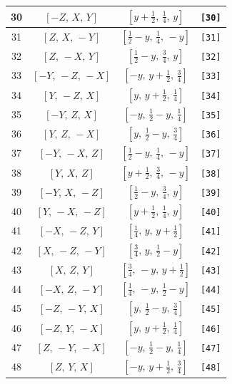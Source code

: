\documentclass[fleqn,8pt]{jsarticle}
\begin{document}
\begin{longtable}{cccc}
30 & $\left[ - Z,\, X,\, Y \right]$ & $\left[ y + \frac{1}{2},\, \frac{1}{4},\, y \right]$ & {\tt [30]} \\ \hline
31 & $\left[ Z,\, X,\, - Y \right]$ & $\left[ \frac{1}{2} - y,\, \frac{1}{4},\, - y \right]$ & {\tt [31]} \\ \hline
32 & $\left[ Z,\, - X,\, Y \right]$ & $\left[ \frac{1}{2} - y,\, \frac{3}{4},\, y \right]$ & {\tt [32]} \\ \hline
33 & $\left[ - Y,\, - Z,\, - X \right]$ & $\left[ - y,\, y + \frac{1}{2},\, \frac{3}{4} \right]$ & {\tt [33]} \\ \hline
34 & $\left[ Y,\, - Z,\, X \right]$ & $\left[ y,\, y + \frac{1}{2},\, \frac{1}{4} \right]$ & {\tt [34]} \\ \hline
35 & $\left[ - Y,\, Z,\, X \right]$ & $\left[ - y,\, \frac{1}{2} - y,\, \frac{1}{4} \right]$ & {\tt [35]} \\ \hline
36 & $\left[ Y,\, Z,\, - X \right]$ & $\left[ y,\, \frac{1}{2} - y,\, \frac{3}{4} \right]$ & {\tt [36]} \\ \hline
37 & $\left[ - Y,\, - X,\, Z \right]$ & $\left[ \frac{1}{2} - y,\, \frac{1}{4},\, - y \right]$ & {\tt [37]} \\ \hline
38 & $\left[ Y,\, X,\, Z \right]$ & $\left[ y + \frac{1}{2},\, \frac{3}{4},\, - y \right]$ & {\tt [38]} \\ \hline
39 & $\left[ - Y,\, X,\, - Z \right]$ & $\left[ \frac{1}{2} - y,\, \frac{3}{4},\, y \right]$ & {\tt [39]} \\ \hline
40 & $\left[ Y,\, - X,\, - Z \right]$ & $\left[ y + \frac{1}{2},\, \frac{1}{4},\, y \right]$ & {\tt [40]} \\ \hline
41 & $\left[ - X,\, - Z,\, Y \right]$ & $\left[ \frac{1}{4},\, y,\, y + \frac{1}{2} \right]$ & {\tt [41]} \\ \hline
42 & $\left[ X,\, - Z,\, - Y \right]$ & $\left[ \frac{3}{4},\, y,\, \frac{1}{2} - y \right]$ & {\tt [42]} \\ \hline
43 & $\left[ X,\, Z,\, Y \right]$ & $\left[ \frac{3}{4},\, - y,\, y + \frac{1}{2} \right]$ & {\tt [43]} \\ \hline
44 & $\left[ - X,\, Z,\, - Y \right]$ & $\left[ \frac{1}{4},\, - y,\, \frac{1}{2} - y \right]$ & {\tt [44]} \\ \hline
45 & $\left[ - Z,\, - Y,\, X \right]$ & $\left[ y,\, \frac{1}{2} - y,\, \frac{3}{4} \right]$ & {\tt [45]} \\ \hline
46 & $\left[ - Z,\, Y,\, - X \right]$ & $\left[ y,\, y + \frac{1}{2},\, \frac{1}{4} \right]$ & {\tt [46]} \\ \hline
47 & $\left[ Z,\, - Y,\, - X \right]$ & $\left[ - y,\, \frac{1}{2} - y,\, \frac{1}{4} \right]$ & {\tt [47]} \\ \hline
48 & $\left[ Z,\, Y,\, X \right]$ & $\left[ - y,\, y + \frac{1}{2},\, \frac{3}{4} \right]$ & {\tt [48]} \\
\end{longtable}
\end{document}
